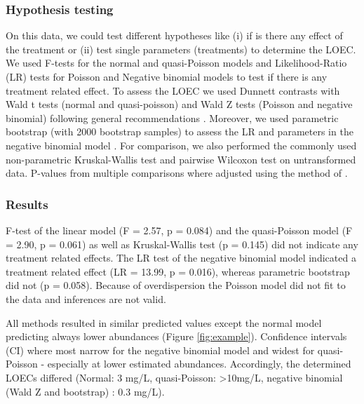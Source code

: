 \documentclass{scrartcl}
\begin{document}
\subsubsection{Hypothesis testing}

On this data, we could test different hypotheses like (i) if is there any effect of the treatment or (ii) test single parameters (treatments) to determine the LOEC.
We used F-tests for the normal and quasi-Poisson models and Likelihood-Ratio (LR) tests for Poisson and Negative binomial models to test if there is any treatment related effect.
To assess the LOEC we used Dunnett contrasts with Wald t tests (normal and quasi-poisson) and Wald Z tests (Poisson and negative binomial) following general recommendations \citep{bolker_generalized_2009}. 
Moreover, we used parametric bootstrap (with 2000 bootstrap samples) to assess the LR and parameters in the negative binomial model \citep{faraway_extending_2006}.
For comparison, we also performed the commonly used non-parametric Kruskal-Wallis test and pairwise Wilcoxon test on untransformed data.
P-values from multiple comparisons where adjusted using the method of \citet{holm_simple_1979}.


\subsubsection{Results}
F-test of the linear model  (F = 2.57, p = 0.084) and the quasi-Poisson model (F = 2.90, p = 0.061) as well as Kruskal-Wallis test (p = 0.145) did not indicate any treatment related effects.
The LR test of the negative binomial model indicated a treatment related effect (LR = 13.99, p = 0.016), whereas parametric bootstrap did not (p = 0.058).
Because of overdispersion the Poisson model did not fit to the data and inferences are not valid. 

All methods resulted in similar predicted values except the normal model predicting always lower abundances (Figure \ref{fig:example}). 
Confidence intervals (CI) where most narrow for the negative binomial model and widest for quasi-Poisson - especially at lower estimated abundances.
Accordingly, the determined LOECs differed (Normal: 3 mg/L, quasi-Poisson: \textgreater 10mg/L, negative binomial (Wald Z and bootstrap) : 0.3 mg/L).
\end{document}
